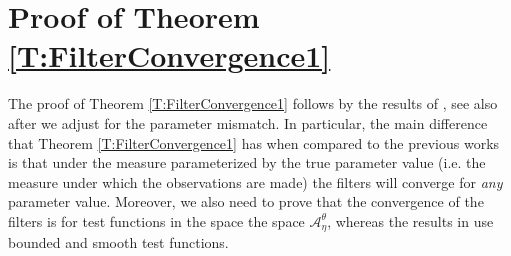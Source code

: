 \documentclass{article}
\begin{document}
\appendix

\section{Proof of Theorem \ref{T:FilterConvergence1}}
\label{A:FilterConvergence1}

The proof of Theorem \ref{T:FilterConvergence1} follows by the results of \cite{ImkellerSriPerkowskiYeong2012}, see also \cite{ParkSriSowers2008, ParkRozovskySowers2010,ParkSriSowers2011,ImkellerSriPerkowskiYeong2012} after we adjust for the parameter mismatch. In particular, the main difference that Theorem \ref{T:FilterConvergence1} has when compared to the previous works is that
under the measure parameterized  by the true parameter value (i.e. the measure under which the observations are made) the filters will converge for \textit{any} parameter value.  Moreover, we also need to prove that the convergence of the filters is for test functions in the space the space $\mathcal{A}_{\eta}^{\theta}$, whereas the results in \cite{ImkellerSriPerkowskiYeong2012} use bounded and smooth test functions.
\end{document}

